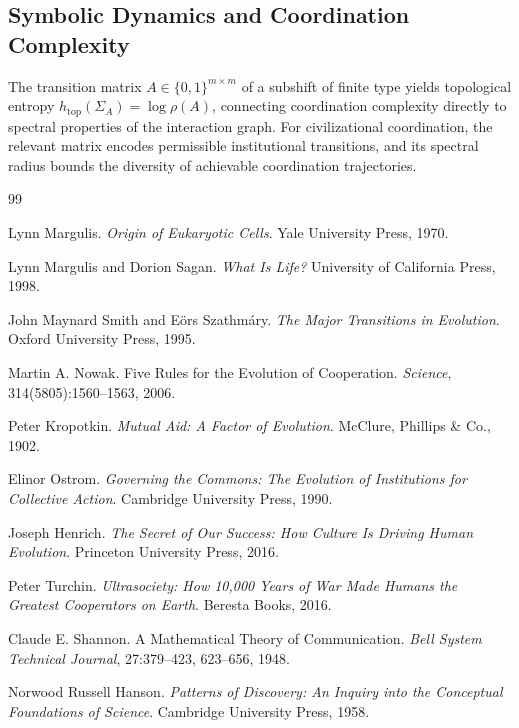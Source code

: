 \documentclass[12pt]{article}
\begin{document}
\subsection{Symbolic Dynamics and Coordination Complexity}

The transition matrix $A \in \{0,1\}^{m \times m}$ of a subshift of finite type yields topological entropy $h_{\mathrm{top}}(\Sigma_A) = \log\rho(A)$, connecting coordination complexity directly to spectral properties of the interaction graph. For civilizational coordination, the relevant matrix encodes permissible institutional transitions, and its spectral radius bounds the diversity of achievable coordination trajectories.

\newpage
\begin{thebibliography}{99}

Lynn Margulis.
\textit{Origin of Eukaryotic Cells}.
Yale University Press, 1970.

Lynn Margulis and Dorion Sagan.
\textit{What Is Life?}
University of California Press, 1998.

John Maynard Smith and Eörs Szathmáry.
\textit{The Major Transitions in Evolution}.
Oxford University Press, 1995.

Martin A. Nowak.
Five Rules for the Evolution of Cooperation.
\textit{Science}, 314(5805):1560--1563, 2006.

Peter Kropotkin.
\textit{Mutual Aid: A Factor of Evolution}.
McClure, Phillips \& Co., 1902.

Elinor Ostrom.
\textit{Governing the Commons: The Evolution of Institutions for Collective Action}.
Cambridge University Press, 1990.

Joseph Henrich.
\textit{The Secret of Our Success: How Culture Is Driving Human Evolution}.
Princeton University Press, 2016.

Peter Turchin.
\textit{Ultrasociety: How 10,000 Years of War Made Humans the Greatest Cooperators on Earth}.
Beresta Books, 2016.

Claude E. Shannon.
A Mathematical Theory of Communication.
\textit{Bell System Technical Journal}, 27:379--423, 623--656, 1948.

Norwood Russell Hanson.
\textit{Patterns of Discovery: An Inquiry into the Conceptual Foundations of Science}.
Cambridge University Press, 1958.


\end{thebibliography}
\end{document}
